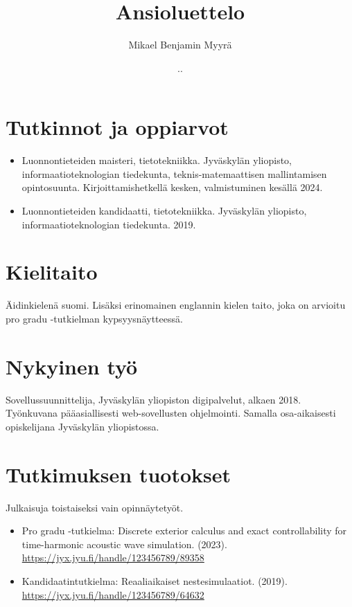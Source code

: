 \documentclass{article}
\title{Ansioluettelo}
\author{Mikael Benjamin Myyrä}
\date{\number\day.\number\month.\number\year}
\begin{document}
\maketitle

\section*{Tutkinnot ja oppiarvot}

\begin{itemize}
  \item Luonnontieteiden maisteri, tietotekniikka.
    Jyväskylän yliopisto, informaatioteknologian tiedekunta,
    teknis-matemaattisen mallintamisen opintosuunta.
    Kirjoittamishetkellä kesken, valmistuminen kesällä 2024.
  \item Luonnontieteiden kandidaatti, tietotekniikka.
    Jyväskylän yliopisto, informaatioteknologian tiedekunta.
    2019.
\end{itemize}

\section*{Kielitaito}

Äidinkielenä suomi. Lisäksi erinomainen englannin kielen taito,
joka on arvioitu pro gradu -tutkielman kypsyysnäytteessä.

\section*{Nykyinen työ}

Sovellussuunnittelija, Jyväskylän yliopiston digipalvelut, alkaen 2018.
Työnkuvana pääasiallisesti web-sovellusten ohjelmointi.
Samalla osa-aikaisesti opiskelijana Jyväskylän yliopistossa.

\section*{Tutkimuksen tuotokset}

Julkaisuja toistaiseksi vain opinnäytetyöt.
\begin{itemize}
  \item Pro gradu -tutkielma:
    Discrete exterior calculus and exact controllability
    for time-harmonic acoustic wave simulation. (2023).
    \url{https://jyx.jyu.fi/handle/123456789/89358}
  \item Kandidaatintutkielma:
    Reaaliaikaiset nestesimulaatiot. (2019).
    \url{https://jyx.jyu.fi/handle/123456789/64632}
\end{itemize}
\end{document}
